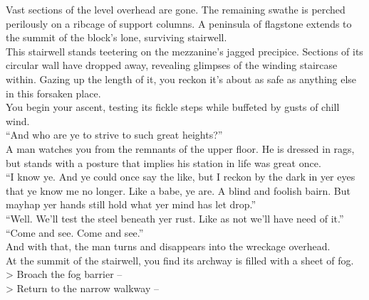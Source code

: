 Vast sections of the level overhead are gone. The remaining swathe is perched perilously on a ribcage of support columns. A peninsula of flagstone extends to the summit of the block’s lone, surviving stairwell.\\

This stairwell stands teetering on the mezzanine’s jagged precipice. Sections of its circular wall have dropped away, revealing glimpses of the winding staircase within. Gazing up the length of it, you reckon it’s about as safe as anything else in this forsaken place.\\

You begin your ascent, testing its fickle steps while buffeted by gusts of chill wind.\\

“And who are ye to strive to such great heights?”\\

A man watches you from the remnants of the upper floor. He is dressed in rags, but stands with a posture that implies his station in life was great once.\\

“I know ye. And ye could once say the like, but I reckon by the dark in yer eyes that ye know me no longer. Like a babe, ye are. A blind and foolish bairn. But mayhap yer hands still hold what yer mind has let drop.”\\

“Well. We’ll test the steel beneath yer rust. Like as not we’ll have need of it.”\\

“Come and see. Come and see.”\\

And with that, the man turns and disappears into the wreckage overhead.\\

At the summit of the stairwell, you find its archway is filled with a sheet of fog.\\

> Broach the fog barrier -- \\
> Return to the narrow walkway -- 
